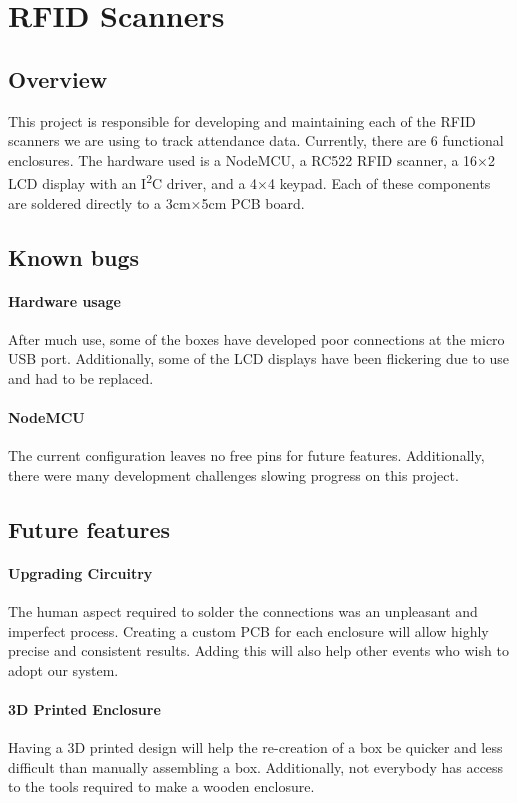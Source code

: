 \documentclass[twoside, 12pt]{article}
\begin{document}
\section{RFID Scanners}
\subsection{Overview}
\par This project is responsible for developing and maintaining each of the RFID scanners we are using to track attendance data.  Currently, there are 6 functional enclosures.  The hardware used is a NodeMCU, a RC522 RFID scanner, a 16$\times$2 LCD display with an I\textsuperscript{2}C driver, and a 4$\times$4 keypad.  Each of these components are soldered directly to a 3cm$\times$5cm PCB board.
\subsection{Known bugs}
\paragraph{Hardware usage}
\par After much use, some of the boxes have developed poor connections at the micro USB port.  Additionally, some of the LCD displays have been flickering due to use and had to be replaced.  
\paragraph{NodeMCU}
\par The current configuration leaves no free pins for future features.  Additionally, there were many development challenges slowing progress on this project.
\subsection{Future features}
\paragraph{Upgrading Circuitry}
\par The human aspect required to solder the connections was an unpleasant and imperfect process.  Creating a custom PCB for each enclosure will allow highly precise and consistent  results.  Adding this will also help other events who wish to adopt our system.
\paragraph{3D Printed Enclosure}
\par Having a 3D printed design will help the re-creation of a box be quicker and less difficult than manually assembling a box.  Additionally, not everybody has access to the tools required to make a wooden enclosure.
\end{document}

